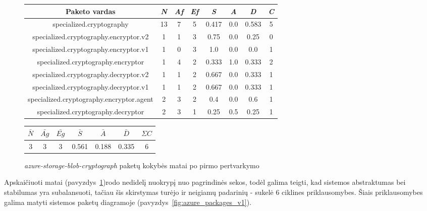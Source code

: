 \begin{figure}[H]
\begin{center}
    \begin{tabular}{|c|c|c|c|c|c|c|c|}
        \hline
        Paketo vardas & \textit{N} & \textit{Af} & \textit{Ef} & \textit{S} & \textit{A} & \textit{D} & \textit{C} \\ [0.5ex]
        \hline\hline
        specialized.cryptography & 13 & 7 & 5 & 0.417 & 0.0 & 0.583 & 5 \\
        \hline
        specialized.cryptography.encryptor.v2 & 1 & 1 & 3 & 0.75 & 0.0 & 0.25 & 0 \\
        \hline
        specialized.cryptography.encryptor.v1 & 1 & 0 & 3 & 1.0 & 0.0 & 0.0 & 1 \\
        \hline
        specialized.cryptography.encryptor & 1 & 4 & 2 & 0.333 & 1.0 & 0.333 & 2 \\
        \hline
        specialized.cryptography.decryptor.v2 & 1 & 1 & 2 & 0.667 & 0.0 & 0.333 & 1 \\
        \hline
        specialized.cryptography.decryptor.v1 & 1 & 1 & 2 & 0.667 & 0.0 & 0.333 & 1\\
        \hline
        specialized.cryptography.encryptor.agent & 2 & 3 & 2 & 0.4 & 0.0 & 0.6 & 1\\
        \hline
        specialized.cryptography.decryptor & 2 & 3 & 1 & 0.25 & 0.5 & 0.25 & 1 \\
        \hline
    \end{tabular}
    \begin{tabular}{|c|c|c|c|c|c|c|}
        \hline
        $\bar{N}$ & $\bar{Ag}$ & $\bar{Eg}$ & $\bar{S}$ & $\bar{A}$ & $\bar{D}$ & $\Sigma C$ \\ [0.5ex]
        \hline\hline
        3 & 3 & 3 & 0.561 & 0.188 & \cellcolor{green!25} 0.335 & \cellcolor{red!25} 6 \\
        \hline
    \end{tabular}
\end{center}
\caption{\textit{azure-storage-blob-cryptograph} paketų kokybės matai po pirmo pertvarkymo}
\label{table:matais}
\end{figure}
Apskaičiuoti matai (pavyzdys~\ref{table:matais})rodo nedidelį nuokrypį nuo pagrindinės sekos, todėl galima teigti, kad sistemos abstraktumas bei stabilumas
yra subalansuoti, tačiau šis skirstymas turėjo ir neigiamų padarinių - sukelė 6 ciklines priklausomybes.
Šiais priklausomybes galima matyti sistemos paketų diagramoje (pavyzdys~\ref{fig:azure_packages_v1}).

